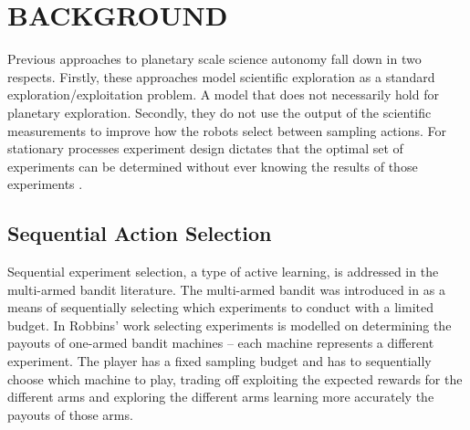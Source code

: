 \section{BACKGROUND}
\label{sec:background}


Previous approaches to planetary scale science autonomy fall down in two
respects.  Firstly, these approaches model scientific exploration as a standard
exploration/exploitation problem.  A model that does not necessarily hold for
planetary exploration.  Secondly, they do not use the output of the scientific
measurements to improve how the robots select between sampling actions.  For
stationary processes experiment design dictates that the optimal set
of experiments can be determined without ever knowing the results of those
experiments \cite{srinivas2009gaussian}.

\subsection{Sequential Action Selection}

Sequential experiment selection, a type of active learning, is addressed in the
multi-armed bandit literature.  The multi-armed bandit was introduced in
\cite{robbins1952some} as a means of sequentially selecting which experiments
to conduct with a limited budget.  In Robbins' work \cite{robbins1952some}
selecting experiments is modelled on determining the
payouts of one-armed bandit machines -- each machine represents a different
experiment.  The player has a fixed sampling budget and has to sequentially
choose which machine to play, trading off exploiting the expected rewards for
the different arms and exploring the different arms learning more accurately
the payouts of those arms.  

